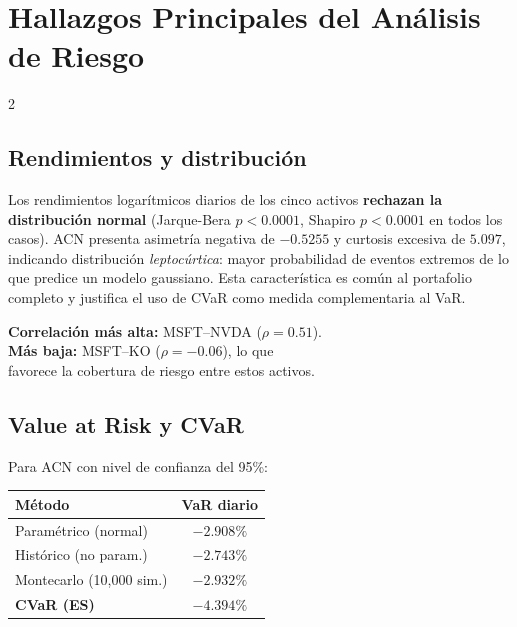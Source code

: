 \documentclass[10pt,a4paper]{article}
\begin{document}
\vspace{6pt}

\section{Hallazgos Principales del Análisis de Riesgo}

\begin{multicols}{2}

\subsection{Rendimientos y distribución}

Los rendimientos logarítmicos diarios de los cinco activos \textbf{rechazan la distribución normal} (Jarque-Bera $p<0.0001$, Shapiro $p<0.0001$ en todos los casos). ACN presenta asimetría negativa de $-0.5255$ y curtosis excesiva de $5.097$, indicando distribución \emph{leptocúrtica}: mayor probabilidad de eventos extremos de lo que predice un modelo gaussiano. Esta característica es común al portafolio completo y justifica el uso de CVaR como medida complementaria al VaR.

\begin{insightbox}
\footnotesize\textbf{Correlación más alta:} MSFT--NVDA ($\rho=0.51$). \\
\textbf{Más baja:} MSFT--KO ($\rho=-0.06$), lo que \\
favorece la cobertura de riesgo entre estos activos.
\end{insightbox}

\subsection{Value at Risk y CVaR}

Para ACN con nivel de confianza del 95\%:

{\footnotesize
\begin{tabular}{@{}lc@{}}
\toprule
\textbf{Método} & \textbf{VaR diario} \\
\midrule
Paramétrico (normal)    & $-2.908\%$ \\
Histórico (no param.)   & $-2.743\%$ \\
Montecarlo (10,000 sim.)& $-2.932\%$ \\
\textbf{CVaR (ES)}      & $\mathbf{-4.394\%}$ \\
\bottomrule
\end{tabular}
}


\end{multicols}
\end{document}

